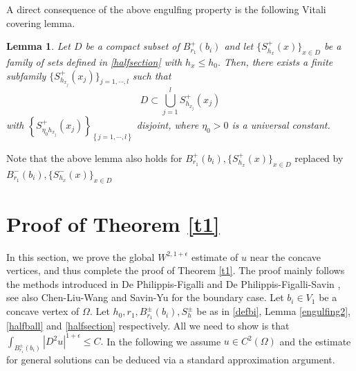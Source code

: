\documentclass[11pt]{amsart}
\theoremstyle{plain}
\newtheorem{lemma}{Lemma}[section]
\newcommand{\0}{\textbf{0}}
\numberwithin{equation}{section}
\numberwithin{equation}{section}
\numberwithin{figure}{section}
\begin{document}
	
	A direct consequence of the above engulfing property is the following Vitali covering lemma.
	\begin{lemma}\label{cover2}
		Let $D$ be a compact subset of $B^{+}_{r_1}(b_i)$ and let $\{S^+_{h_x}(x)\}_{x\in D}$ be a family of sets defined in \eqref{halfsection} with $h_x\leq h_0.$ Then, there exists a finite subfamily $\{S^+_{h_{x_j}}(x_j)\}_{j=1,\cdots, l}$ such that 
		$$D\subset \bigcup^{l}_{j=1} S^+_{h_{x_j}}(x_j)$$
		with $\left\{S^+_{\eta_0 h_{x_j}}(x_j)\right\}_{\left\{j=1,\cdots, l\right\}}$ disjoint, where $\eta_0>0$ is a universal constant.
	\end{lemma}
	Note that the above lemma also holds for $B^{+}_{r_1}(b_i), \{S^+_{h_x}(x)\}_{x\in D}$ replaced
	by $B^{-}_{r_1}(b_i), \{S^-_{h_x}(x)\}_{x\in D}$
	
	
	\section{Proof of Theorem \ref{t1}}
	
	In this section, we prove the global $W^{2,1+\epsilon}$ estimate of $u$ near the concave vertices, and thus complete the proof of Theorem \ref{t1}.
	The proof mainly follows the methods introduced in
	De Philippis-Figalli \cite{DF} and De Philippis-Figalli-Savin \cite{DFS}, see also  Chen-Liu-Wang \cite{CLW2} and Savin-Yu \cite{SY2} for the boundary case.
	Let $b_i\in V_1$ be a concave vertex of $\Omega.$ Let $h_0, r_1, B^{\pm}_{r_1}(b_i), S_h^{\pm}$ be as in \eqref{defbi}, Lemma \ref{engulfing2}, \eqref{halfball} and \eqref{halfsection} respectively. 
	All we need to show is that $\int_{B^{\pm}_{r_1}(b_i)}|D^2u|^{1+\epsilon}\leq C.$
	In the following we assume $u\in C^2(\Omega)$  and the estimate for general solutions can be deduced via a standard approximation argument.
	
\end{document}
